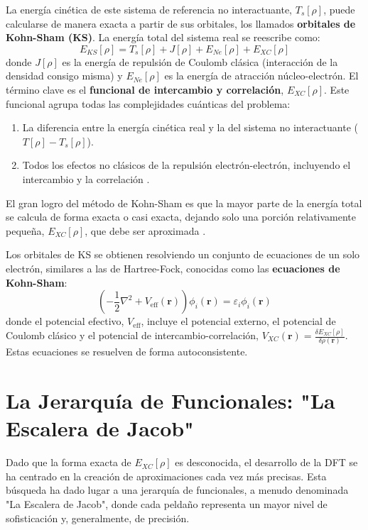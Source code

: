 La energía cinética de este sistema de referencia no interactuante, $T_s[\rho]$, puede calcularse de manera exacta a partir de sus orbitales, los llamados \textbf{orbitales de Kohn-Sham (KS)}. La energía total del sistema real se reescribe como:
$$ E_{KS}[\rho] = T_s[\rho] + J[\rho] + E_{Ne}[\rho] + E_{XC}[\rho] $$
donde $J[\rho]$ es la energía de repulsión de Coulomb clásica (interacción de la densidad consigo misma) y $E_{Ne}[\rho]$ es la energía de atracción núcleo-electrón. El término clave es el \textbf{funcional de intercambio y correlación}, $E_{XC}[\rho]$. Este funcional agrupa todas las complejidades cuánticas del problema:
\begin{enumerate}
    \item La diferencia entre la energía cinética real y la del sistema no interactuante ($T[\rho] - T_s[\rho]$).
    \item Todos los efectos no clásicos de la repulsión electrón-electrón, incluyendo el intercambio y la correlación \cite[194]{ramachandran2008computational}.
\end{enumerate}
El gran logro del método de Kohn-Sham es que la mayor parte de la energía total se calcula de forma exacta o casi exacta, dejando solo una porción relativamente pequeña, $E_{XC}[\rho]$, que debe ser aproximada \cite[58]{koch2015chemist}.

Los orbitales de KS se obtienen resolviendo un conjunto de ecuaciones de un solo electrón, similares a las de Hartree-Fock, conocidas como las \textbf{ecuaciones de Kohn-Sham}:
$$ \left( -\frac{1}{2}\nabla^2 + V_{\text{eff}}(\mathbf{r}) \right) \phi_i(\mathbf{r}) = \varepsilon_i \phi_i(\mathbf{r}) $$
donde el potencial efectivo, $V_{\text{eff}}$, incluye el potencial externo, el potencial de Coulomb clásico y el potencial de intercambio-correlación, $V_{XC}(\mathbf{r}) = \frac{\delta E_{XC}[\rho]}{\delta \rho(\mathbf{r})}$. Estas ecuaciones se resuelven de forma autoconsistente.

\section{La Jerarquía de Funcionales: "La Escalera de Jacob"}
Dado que la forma exacta de $E_{XC}[\rho]$ es desconocida, el desarrollo de la DFT se ha centrado en la creación de aproximaciones cada vez más precisas. Esta búsqueda ha dado lugar a una jerarquía de funcionales, a menudo denominada "La Escalera de Jacob", donde cada peldaño representa un mayor nivel de sofisticación y, generalmente, de precisión.

